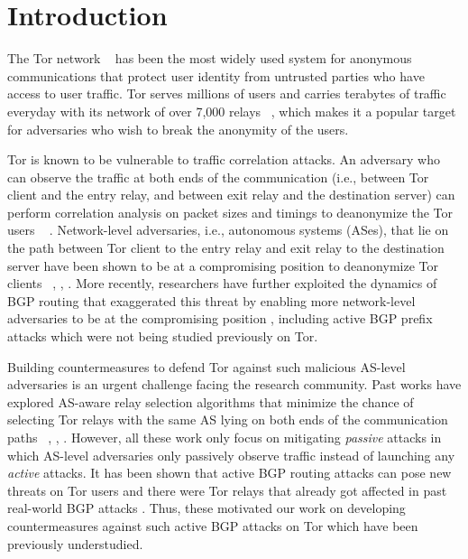 \section{Introduction}

The Tor network ~\cite{dingledine2004tor} has been the most widely used system for anonymous communications that protect user identity from untrusted parties who have access to user traffic. Tor serves millions of users and carries terabytes of traffic everyday with its network of over 7,000 relays ~\cite{tormetrics}, which makes it a popular target for adversaries who wish to break the anonymity of the users. 

Tor is known to be vulnerable to traffic correlation attacks. An adversary who can observe the traffic at both ends of the communication (i.e., between Tor client and the entry relay, and between exit relay and the destination server) can perform  correlation analysis on packet sizes and timings to deanonymize the Tor users ~\cite{shmatikov2006timing} \cite{syverson2001towards}. Network-level adversaries, i.e., autonomous systems (ASes), that lie on the path between Tor client to the entry relay and exit relay to the destination server have been shown to be at a compromising position to deanonymize Tor clients ~\cite{feamster2004location}, \cite{edman2009awareness}, \cite{johnson2013users}. More recently, researchers have further exploited the dynamics of BGP routing that exaggerated this threat by enabling more network-level adversaries to be at the compromising position \cite{sun2015raptor}, including active BGP prefix attacks which were not being studied previously on Tor. 

Building countermeasures to defend Tor against such malicious AS-level adversaries is an urgent challenge facing the research community. Past works have explored AS-aware relay selection algorithms that minimize the chance of selecting Tor relays with the same AS lying on both ends of the communication paths ~\cite{edman2009awareness}, \cite{akhoondi2012lastor}, \cite{starov2015measuring}. However, all these work only focus on mitigating \emph{passive} attacks in which AS-level adversaries only passively observe traffic instead of launching any \emph{active} attacks. It has been shown that active BGP routing attacks can pose new threats on Tor users and there were Tor relays that already got affected in past real-world BGP attacks \cite{sun2015raptor}. Thus, these motivated our work on developing countermeasures against such active BGP attacks on Tor which have been previously understudied. 

